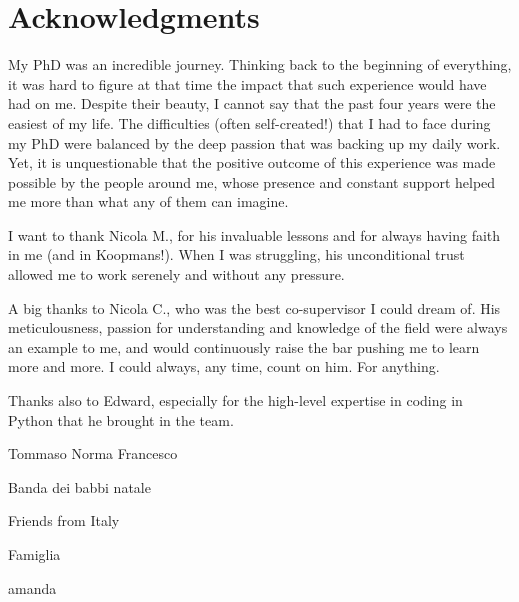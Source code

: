 
\chapter*{Acknowledgments}
\vspace{2.5cm}
%

My PhD was an incredible journey. Thinking back to the beginning of everything, it was hard to figure at that time the impact that such experience would have had on me. Despite their beauty, I cannot say that the past four years were the easiest of my life. The difficulties (often self-created!) that I had to face during my PhD were balanced by the deep passion that was backing up my daily work. Yet, it is unquestionable that the positive outcome of this experience was made possible by the people around me, whose presence and constant support helped me more than what any of them can imagine.

I want to thank Nicola M., for his invaluable lessons and for always having faith in me (and in Koopmans!). When I was struggling, his unconditional trust allowed me to work serenely and without any pressure.

A big thanks to Nicola C., who was the best co-supervisor I could dream of. His meticulousness, passion for understanding and knowledge of the field were always an example to me, and would continuously raise the bar pushing me to learn more and more. I could always, any time, count on him. For anything.

Thanks also to Edward, especially for the high-level expertise in coding in Python that he brought in the team.

Tommaso Norma Francesco

Banda dei babbi natale

Friends from Italy

Famiglia

amanda